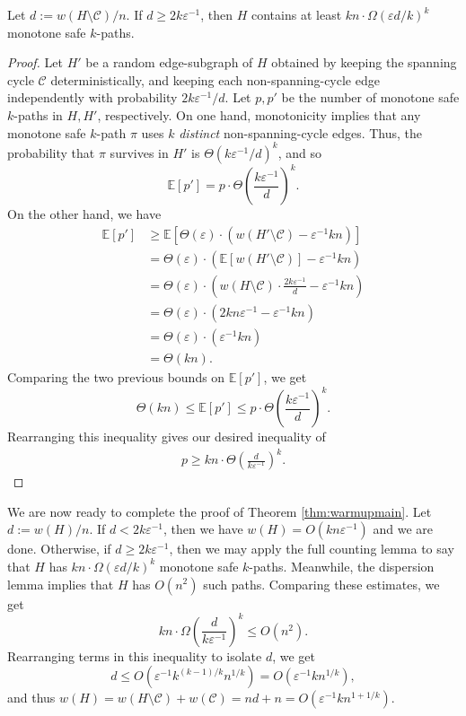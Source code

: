 \documentclass{article}\usepackage[a4paper,margin=20mm]{geometry}
\newcommand{\eps}{\varepsilon}
\newcommand{\cee}{\mathcal{C}}
\begin{document}
\begin{lemma}  \label{lem:warmupfc}
Let $d := w(H \setminus \cee) / n$.
If $d \ge 2k \eps^{-1}$, then $H$ contains at least $kn \cdot \Omega(\eps d/k)^k$ monotone safe $k$-paths.
\end{lemma}
\begin{proof}
Let $H'$ be a random edge-subgraph of $H$ obtained by keeping the spanning cycle $\cee$ deterministically, and keeping each non-spanning-cycle edge independently with probability $2k\eps^{-1} / d$.
Let $p, p'$ be the number of monotone safe $k$-paths in $H, H'$, respectively.
On one hand, monotonicity implies that any monotone safe $k$-path $\pi$ uses $k$ \emph{distinct} non-spanning-cycle edges.
Thus, the probability that $\pi$ survives in $H'$ is $\Theta(k\eps^{-1} / d)^{k}$, and so
$$\mathbb{E}[p'] = p \cdot \Theta\left(\frac{k\eps^{-1}}{d}\right)^{k}.$$
On the other hand, we have
\begin{align*}
\mathbb{E}[p'] &\ge \mathbb{E}\left[\Theta(\eps) \cdot \left( w(H' \setminus \cee) - \eps^{-1} kn \right)\right] \tag*{Medium Counting Lemma}\\
&= \Theta(\eps) \cdot \left(\mathbb{E}\left[ w(H' \setminus \cee)\right] - \eps^{-1} kn\right)\\
&= \Theta(\eps) \cdot \left( w(H \setminus \cee) \cdot \frac{2k \eps^{-1}}{d} - \eps^{-1} kn\right)\\
&= \Theta(\eps) \cdot \left( 2kn \eps^{-1} - \eps^{-1} kn\right)\\
&= \Theta(\eps) \cdot \left( \eps^{-1} kn\right)\\
&= \Theta(kn).
\end{align*}
Comparing the two previous bounds on $\mathbb{E}[p']$, we get
$$\Theta(kn) \le \mathbb{E}[p'] \le p \cdot \Theta\left(\frac{k \eps^{-1}}{d}\right)^{k}.$$
Rearranging this inequality gives our desired inequality of
\begin{align*}
p \ge kn \cdot \Theta\left( \frac{d}{k \eps^{-1}} \right)^k. \tag*{\qedhere}
\end{align*}
\end{proof}


We are now ready to complete the proof of Theorem \ref{thm:warmupmain}.
Let $d := w(H)/n$.
If $d < 2k \eps^{-1}$, then we have $w(H) = O(kn \eps^{-1})$ and we are done.
Otherwise, if $d \ge 2k \eps^{-1}$, then we may apply the full counting lemma to say that $H$ has $kn \cdot \Omega(\eps d/k)^k$ monotone safe $k$-paths.
Meanwhile, the dispersion lemma implies that $H$ has $O(n^2)$ such paths.
Comparing these estimates, we get
$$kn \cdot \Omega\left(\frac{d}{k\eps^{-1}}\right)^k \le O(n^2).$$
Rearranging terms in this inequality to isolate $d$, we get
$$d \le O\left(\eps^{-1} k^{(k-1)/k} n^{1/k}\right) = O\left(\eps^{-1} k n^{1/k} \right),$$
and thus $w(H) = w(H \setminus \cee) + w(\cee) = nd + n = O\left( \eps^{-1} k n^{1+1/k} \right)$.
\end{document}
